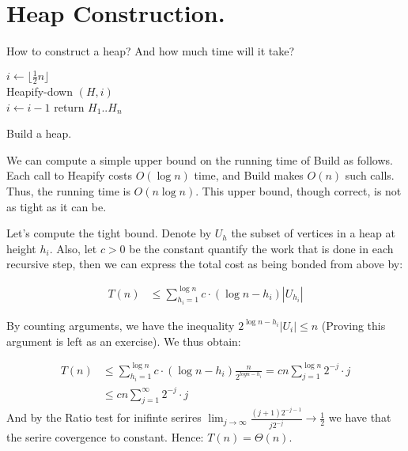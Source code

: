\section{Heap Construction.} How to construct a heap? And how much time will it take?   

\begin{algorithm}[H]
  $ i \leftarrow \lfloor \frac{1}{2}n  \rfloor $ \\
  { 
    Heapify-down $\left( H, i \right)$ \\ 
    $ i \leftarrow i - 1 $  
  }
return $H_{1} .. H_{n}$
\caption{ Build a heap. } 
\end{algorithm}
We can compute a simple upper bound on the running time of Build as follows. Each call to Heapify costs $O(\log n)$ time, and Build makes $O(n)$ such calls. Thus, the running time is $O(n \log n)$. This upper bound, though correct, is not as tight as it can be.

Let's compute the tight bound. Denote by $U_h$ the subset of vertices in a heap at height $h_{i}$. Also, let $c > 0 $ be the constant quantify the work that is done in each recursive step, then we can express the total cost as being bonded from above by: 

\begin{equation*}
  \begin{split}
    T\left( n \right) & \le \sum_{ h_{i} =1}^{ \log n }{c \cdot \left( \log n -  h_{i} \right)  |U_{h_{i}}|   } 
  \end{split}
\end{equation*}

By counting arguments, we have the inequality $ 2^{\log n - h_{i}}|U_{i}| \le n $ (Proving this argument is left as an exercise). We thus obtain:  

\begin{equation*}
  \begin{split}
    T\left( n \right)  & \le  \sum_{ h_{i} =1}^{ \log n }{c \cdot \left( \log n -  h_{i} \right) \frac{n}{2^{log n - h_{i}} }} = c n \sum_{ j = 1}^{ \log n }{ 2^{-j} \cdot j  }  \\ 
      & \le   c n \sum_{ j = 1}^{ \infty }{ 2^{-j} \cdot j  } 
  \end{split}
\end{equation*}
And by the Ratio test for inifinte serires $ \lim_{j\rightarrow \infty} \frac{(j+1)2^{-j-1}}{j2^{-j}} \rightarrow \frac{1}{2}$ we have that the serire covergence to constant. Hence: $ T\left( n \right) = \Theta\left( n \right) $. 


